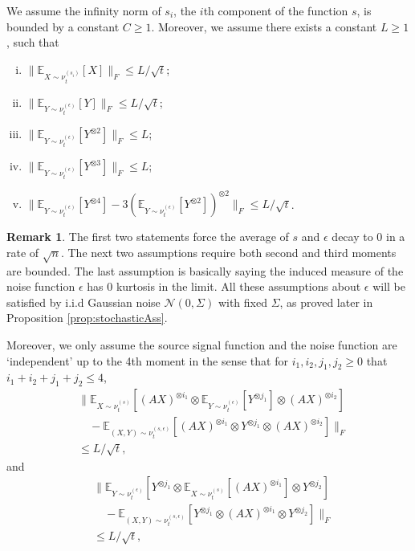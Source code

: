 \documentclass[twoside]{article}
\newcommand{\E}{\mathbb{E}}
\theoremstyle{definition}
\newtheorem{remark}[lemma]{Remark}
\begin{document}
We assume the infinity norm of $s_i$, the $i$th component of the function $s$, is bounded by a constant $C\ge 1$.
Moreover, we assume there exists a constant $L\ge 1$, such that 
\begin{enumerate}[i.]
\vspace{-3mm}
\item $\| \E_{X\sim \nu_t^{(s_i)}} [X] \|_F\le L/\sqrt{t}$;
\item $\| \E_{Y\sim \nu_t^{(\epsilon)}} [Y] \|_F \le L/\sqrt{t}$;
\item $\| \E_{Y\sim \nu_t^{(\epsilon)}} [Y^{\otimes 2}] \|_F \le L$;
\item $\| \E_{Y\sim \nu_t^{(\epsilon)}} [Y^{\otimes 3}] \|_F \le L$;
\item $\| \E_{Y\sim \nu_t^{(\epsilon)}} [Y^{\otimes4}] - 3(\E_{Y\sim \nu_t^{(\epsilon)}} [Y^{\otimes2}])^{\otimes 2} \|_F\le L/\sqrt{t}$.
\end{enumerate}
\vspace{-2mm}
\begin{remark}
The first two statements force the average of $s$ and $\epsilon$ decay to 0 in a rate of $\sqrt{n}$.
The next two assumptions require both second and third moments are bounded.
The last assumption is basically saying the induced measure of the noise function $\epsilon$ has 0 kurtosis in the limit.
All these assumptions about $\epsilon$ will be satisfied by i.i.d Gaussian noise $\mathcal{N}(0,\Sigma)$ with fixed $\Sigma$, as proved later in Proposition \ref{prop:stochasticAss}.
\end{remark}
Moreover, we only assume the source signal function and the noise function are `independent' up to the 4th moment in the sense that for $i_1,i_2,j_1,j_2 \ge 0$ that $i_1+i_2+j_1+j_2 \le 4$,  
\begin{align*}
& \| \E_{X\sim \nu_t^{(s)}} [(AX)^{\otimes i_1}\otimes \E_{Y\sim \nu_t^{(\epsilon)}} [Y^{\otimes j_1}] \otimes (AX)^{\otimes i_2}]\\
& \quad - \E_{(X, Y)\sim \nu_t^{(s, \epsilon)}} [(AX)^{\otimes i_1}\otimes Y^{\otimes j_1}\otimes (AX)^{\otimes i_2}]  \|_F \\
& \le L/\sqrt{t},
\end{align*}
and 
\begin{align*}
& \| \E_{Y\sim \nu_t^{(\epsilon)}} [Y^{\otimes j_1} \otimes \E_{X\sim \nu_t^{(s)}} [(AX)^{\otimes i_1}] \otimes Y^{\otimes j_2}] \\
& \quad - \E_{(X, Y)\sim \nu_t^{(s, \epsilon)}} [ Y^{\otimes j_1}\otimes (AX)^{\otimes i_1}\otimes Y^{\otimes j_2}] \|_F \\
& \le L/\sqrt{t},
\end{align*}
\end{document}
